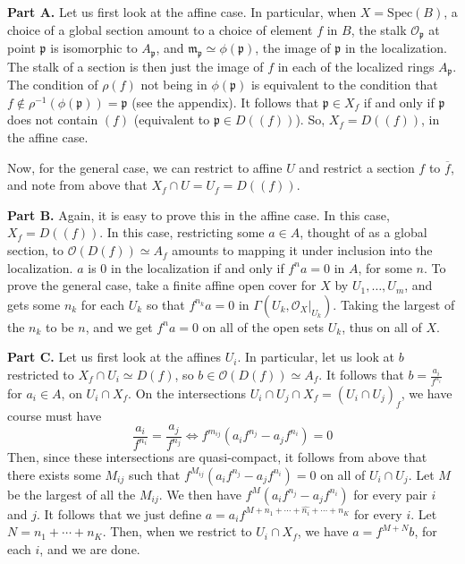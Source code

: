 \documentclass[aps,pra,showpacs,notitlepage,onecolumn,superscriptaddress,nofootinbib]{revtex4-1}
\theoremstyle{definition}
\begin{document}
\noindent \textbf{Part A.} Let us first look at the affine case. In particular, when $X = \text{Spec}(B)$, a choice of a global section amount to a choice of element $f$ in $B$, the stalk $\mathcal{O}_{\mathfrak{p}}$ at point $\mathfrak{p}$
      is isomorphic to $A_{\mathfrak{p}}$, and $\mathfrak{m}_{\mathfrak{p}} \simeq \phi(\mathfrak{p})$, the image of $\mathfrak{p}$ in the localization. The stalk of a section is then just the image of $f$ in each
      of the localized rings $A_{\mathfrak{p}}$. The condition of $\rho(f)$ not being in $\phi(\mathfrak{p})$ is equivalent to the condition that $f \notin \rho^{-1}(\phi(\mathfrak{p})) = \mathfrak{p}$ (see the appendix).
      It follows that $\mathfrak{p} \in X_f$ if and only if $\mathfrak{p}$ does not contain $(f)$ (equivalent to $\mathfrak{p} \in D((f))$). So, $X_f = D((f))$, in the affine case.

      Now, for the general case, we can restrict to affine $U$ and restrict a section $f$ to $\overline{f}$, and note from above that $X_f \cap U = U_f = D((f))$.
      \newline

\noindent \textbf{Part B.} Again, it is easy to prove this in the affine case. In this case, $X_f = D((f))$. In this case, restricting some $a \in A$, thought of as a global section, to $\mathcal{O}(D(f)) \simeq A_f$ amounts to
        mapping it under inclusion into the localization. $a$ is $0$ in the localization if and only if $f^n a = 0$ in $A$, for some $n$. To prove the general case, take a finite affine open cover for $X$
        by $U_1, \dots, U_m$, and gets some $n_k$ for each $U_k$ so that $f^{n_k} a = 0$ in $\Gamma(U_k, \mathcal{O}_X|_{U_k})$. Taking the largest of the $n_k$ to be $n$, and we get $f^n a = 0$ on all of the open
        sets $U_k$, thus on all of $X$.
        \newline

 \noindent \textbf{Part C.} Let us first look at the affines $U_i$. In particular, let us look at $b$ restricted to $X_f \cap U_i \simeq D(f)$, so $b \in \mathcal{O}(D(f)) \simeq A_f$. It follows that $b = \frac{a_i}{f^{n_i}}$
          for $a_i \in A$, on $U_i \cap X_f$. On the intersections $U_i \cap U_j \cap X_f = (U_i \cap U_j)_f$, we have course must have
          \begin{equation}
            \frac{a_i}{f^{n_i}} = \frac{a_j}{f^{n_j}} \Longleftrightarrow f^{m_{ij}} (a_i f^{n_j} - a_j f^{n_i}) = 0
            \end{equation}
          Then, since these intersections are quasi-compact, it follows from above that there exists some $M_{ij}$ such that $f^{M_{ij}} (a_i f^{n_j} - a_j f^{n_i}) = 0$
          on all of $U_i \cap U_j$. Let $M$ be the largest of all the $M_{ij}$. We then have $f^{M} (a_i f^{n_j} - a_j f^{n_i})$ for every pair $i$ and $j$. It follows that we just define
          $a = a_i f^{M + n_1 + \cdots + \hat{n_i} + \cdots + n_K}$ for every $i$. Let $N = n_1 + \cdots + n_K$. Then, when we restrict to $U_i \cap X_f$, we have $a = f^{M + N} b$, for each $i$,
          and we are done.
          \newline
\end{document}
